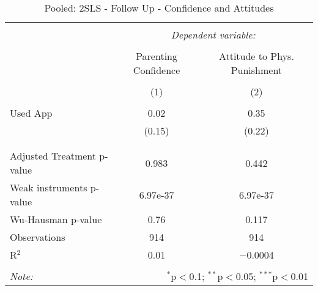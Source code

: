 
\begin{table}[!htbp] \centering 
  \caption{Pooled: 2SLS - Follow Up - Confidence and Attitudes} 
  \label{tbl:Pooled: 2SLS - Follow Up - Confidence and Attitudes} 
\begin{tabular}{@{\extracolsep{5pt}}lcc} 
\\[-1.8ex]\hline 
\hline \\[-1.8ex] 
 & \multicolumn{2}{c}{\textit{Dependent variable:}} \\ 
\cline{2-3} 
\\[-1.8ex] & Parenting Confidence & Attitude to Phys. Punishment \\ 
\\[-1.8ex] & (1) & (2)\\ 
\hline \\[-1.8ex] 
 Used App & 0.02 & 0.35 \\ 
  & (0.15) & (0.22) \\ 
  & & \\ 
\hline \\[-1.8ex] 
Adjusted Treatment p-value & 0.983 & 0.442 \\ 
Weak instruments p-value & 6.97e-37 & 6.97e-37 \\ 
Wu-Hausman p-value & 0.76 & 0.117 \\ 
Observations & 914 & 914 \\ 
R$^{2}$ & 0.01 & $-$0.0004 \\ 
\hline 
\hline \\[-1.8ex] 
\textit{Note:}  & \multicolumn{2}{r}{$^{*}$p$<$0.1; $^{**}$p$<$0.05; $^{***}$p$<$0.01} \\ 
\end{tabular} 
\end{table} 
